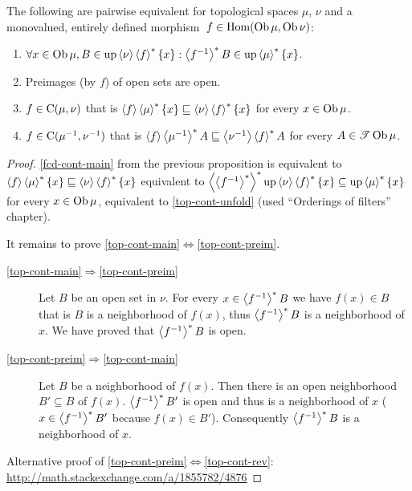 \begin{cor}\label{top-cont}
  The following are pairwise equivalent for topological spaces $\mu$,
  $\nu$ and a monovalued, entirely defined morphism~$f\in\operatorname{Hom}(\operatorname{Ob}\mu,\operatorname{Ob}\nu)$:
  \begin{enumerate}
    \item\label{top-cont-unfold} $\forall x \in \operatorname{Ob} \mu, B \in \operatorname{up} \left\langle \nu\right\rangle
    \left\langle f\right\rangle ^{\ast} \{x\} : \left\langle f^{- 1}\right\rangle ^{\ast} B \in
    \operatorname{up} \left\langle \mu\right\rangle ^{\ast} \{x\}$.

    \item\label{top-cont-preim} Preimages (by $f$) of open sets are open.

    \item\label{top-cont-main} $f \in \mathrm{C} (\mu, \nu)$ that is $\left\langle f\right\rangle
    \left\langle \mu\right\rangle ^{\ast} \{ x \} \sqsubseteq \left\langle \nu\right\rangle
    \left\langle f\right\rangle ^{\ast} \{ x \}$ for every $x \in \operatorname{Ob} \mu$.

    \item\label{top-cont-rev} $f \in \mathrm{C} (\mu^{- 1} , \nu^{- 1})$ that is $\left\langle f\right\rangle
    \left\langle \mu^{- 1}\right\rangle ^{\ast} A \sqsubseteq \left\langle \nu^{- 1}\right\rangle
    \left\langle f\right\rangle ^{\ast} A$ for every $A \in \mathscr{T}
    \operatorname{Ob} \mu$.
  \end{enumerate}
\end{cor}

\begin{proof}
  \ref{fcd-cont-main} from the previous proposition is equivalent to
  $\left\langle f\right\rangle\left\langle \mu\right\rangle ^{\ast}\{x\}\sqsubseteq\left\langle \nu\right\rangle\left\langle f\right\rangle ^{\ast}\{x\}$
  equivalent to $\left\langle \left\langle f^{- 1}\right\rangle ^{\ast}\right\rangle ^{\ast}
  \operatorname{up} \left\langle \nu\right\rangle \left\langle f\right\rangle ^{\ast} \{ x \} \subseteq
  \operatorname{up} \left\langle \mu\right\rangle ^{\ast} \{ x \}$ for every $x \in \operatorname{Ob}
  \mu$, equivalent to \ref{top-cont-unfold} (used ``Orderings of filters'' chapter).

  It remains to prove \ref{top-cont-main}$\Leftrightarrow$\ref{top-cont-preim}.

  \begin{description}
  \item[\ref{top-cont-main}$\Rightarrow$\ref{top-cont-preim}] Let $B$ be an open set in $\nu$. For every $x \in
  \left\langle f^{- 1}\right\rangle ^{\ast} B$ we have $f (x) \in B$ that is $B$ is a
  neighborhood of $f (x)$, thus $\left\langle f^{-1}\right\rangle ^{\ast}B$ is a neighborhood of $x$. We have
  proved that $\left\langle f^{- 1}\right\rangle ^{\ast} B$ is open.

  \item[\ref{top-cont-preim}$\Rightarrow$\ref{top-cont-main}] Let $B$ be a neighborhood of $f (x)$. Then there is an
  open neighborhood $B' \subseteq B$ of $f (x)$. $\left\langle f^{-1}\right\rangle ^{\ast}
  B'$ is open and thus is a neighborhood of $x$ ($x \in \left\langle f^{-1}\right\rangle ^{\ast} B'$ because $f (x) \in B'$). Consequently
  $\left\langle f^{-1}\right\rangle ^{\ast} B$ is a neighborhood of $x$.
  \end{description}

  Alternative proof of \ref{top-cont-preim}$\Leftrightarrow$\ref{top-cont-rev}:
  \url{http://math.stackexchange.com/a/1855782/4876}
\end{proof}

